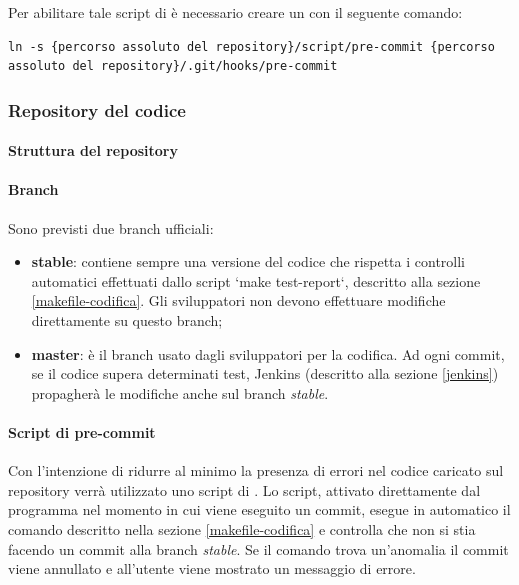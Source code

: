 Per abilitare tale script di  è necessario creare un  con il seguente comando:
\begin{lstlisting}
ln -s {percorso assoluto del repository}/script/pre-commit {percorso assoluto del repository}/.git/hooks/pre-commit
\end{lstlisting}

\subsubsection{Repository del codice}
	\paragraph{Struttura del repository}
	
	\paragraph{Branch}
	
	Sono previsti due branch ufficiali:
	\begin{itemize}
	\item \textbf{stable}: contiene sempre una versione del codice che rispetta i controlli automatici effettuati dallo script `make test-report`, descritto alla sezione \ref{makefile-codifica}. Gli sviluppatori non devono effettuare modifiche direttamente su questo branch;
	
	\item \textbf{master}: è il branch usato dagli sviluppatori per la codifica. Ad ogni commit, se il codice supera determinati test, Jenkins (descritto alla sezione \ref{jenkins}) propagherà le modifiche anche sul branch \emph{stable}.
	\end{itemize}
	
	\paragraph{Script di pre-commit}

Con l'intenzione di ridurre al minimo la presenza di errori nel codice caricato sul repository verrà utilizzato uno script di . Lo script, attivato direttamente dal programma  nel momento in cui viene eseguito un commit, esegue in automatico il comando  descritto nella sezione \ref{makefile-codifica} e controlla che non si stia facendo un commit alla branch \emph{stable}. Se il comando trova un'anomalia il commit viene annullato e all'utente viene mostrato un messaggio di errore.

